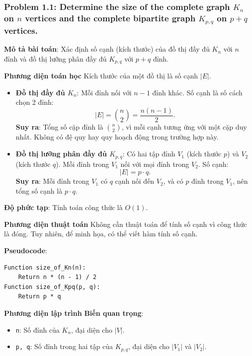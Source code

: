 \documentclass[a4paper,12pt]{article}
\begin{document}
\subsubsection{Problem 1.1: Determine the size of the complete graph $K_n$ on $n$ vertices and the complete bipartite graph $K_{p,q}$ on $p + q$ vertices.}
\textbf{Mô tả bài toán}: Xác định số cạnh (kích thước) của đồ thị đầy đủ \( K_n \) với \( n \) đỉnh và đồ thị lưỡng phân đầy đủ \( K_{p,q} \) với \( p + q \) đỉnh.

\textbf{Phương diện toán học}
Kích thước của một đồ thị là số cạnh \( |E| \).

\begin{itemize}
    \item \textbf{Đồ thị đầy đủ \( K_n \)}: Mỗi đỉnh nối với \( n-1 \) đỉnh khác. Số cạnh là số cách chọn 2 đỉnh:
    \[
    |E| = \binom{n}{2} = \frac{n(n-1)}{2}.
    \]
    \textbf{Suy ra}: Tổng số cặp đỉnh là \( \binom{n}{2} \), vì mỗi cạnh tương ứng với một cặp duy nhất. Không có đệ quy hay quy hoạch động trong trường hợp này.
    \item \textbf{Đồ thị lưỡng phân đầy đủ \( K_{p,q} \)}: Có hai tập đỉnh \( V_1 \) (kích thước \( p \)) và \( V_2 \) (kích thước \( q \)). Mỗi đỉnh trong \( V_1 \) nối với mọi đỉnh trong \( V_2 \). Số cạnh:
    \[
    |E| = p \cdot q.
    \]
    \textbf{Suy ra}: Mỗi đỉnh trong \( V_1 \) có \( q \) cạnh nối đến \( V_2 \), và có \( p \) đỉnh trong \( V_1 \), nên tổng số cạnh là \( p \cdot q \).
\end{itemize}

\textbf{Độ phức tạp}: Tính toán công thức là \( O(1) \).

\textbf{Phương diện thuật toán}
Không cần thuật toán để tính số cạnh vì công thức là đóng. Tuy nhiên, để minh họa, có thể viết hàm tính số cạnh.

\textbf{Pseudocode}:
\begin{verbatim}
Function size_of_Kn(n):
    Return n * (n - 1) / 2
Function size_of_Kpq(p, q):
    Return p * q
\end{verbatim}

\textbf{Phương diện lập trình}
\textbf{Biến quan trọng}:
\begin{itemize}
    \item \texttt{n}: Số đỉnh của \( K_n \), đại diện cho \( |V| \).
    \item \texttt{p, q}: Số đỉnh trong hai tập của \( K_{p,q} \), đại diện cho \( |V_1| \) và \( |V_2| \).
\end{itemize}
\end{document}
